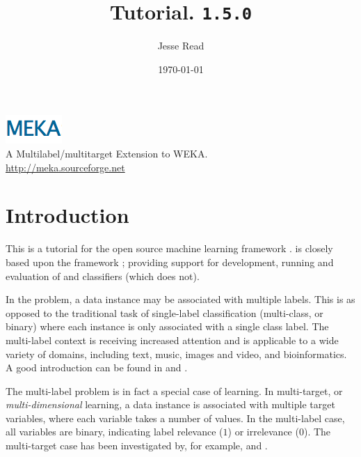 \documentclass[11pt]{article}
\newcommand{\MEKA}{Meka}
\newcommand{\WEKA}{Weka}
\def\version{{\tt 1.5.0}}
\begin{document}
\title{Tutorial. \framework{\MEKA} \version }

\author{Jesse Read}

\date{\mydate\today}

\maketitle

\begin{center}
	\includegraphics{MEKA.png}\\
		A Multilabel/multitarget Extension to WEKA.\\
		\url{http://meka.sourceforge.net}
\end{center}

\tableofcontents

\pagestyle{empty}
\pagebreak

\section{Introduction}

This is a tutorial for the open source machine learning framework \framework{\MEKA}. \framework{\MEKA} is closely based upon the \framework{\WEKA} framework \cite{WEKA}; providing support for development, running and evaluation of  and  classifiers (which  does not).

In the  problem, a data instance may be associated with multiple labels. This is as opposed to the traditional task of single-label classification (\ie multi-class, or binary) where each instance is only associated with a single class label. The multi-label context is receiving increased attention and is applicable to a wide variety of domains, including text, music, images and video, and bioinformatics. A good introduction can be found in \cite{MMD} and \cite{Thesis}.

The multi-label problem is in fact a special case of  learning. In multi-target, or \textit{multi-dimensional} learning, a data instance is associated with multiple target variables, where each variable takes a number of values. In the multi-label case, all variables are binary, indicating label relevance ($1$) or irrelevance ($0$). The multi-target case has been investigated by, for example, \cite{UPM} and \cite{MT}.  
\end{document}
